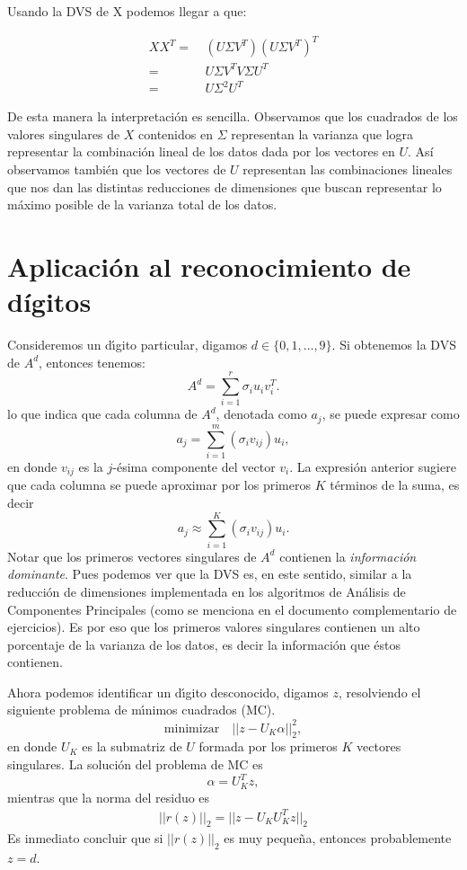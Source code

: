 \documentclass[12pt]{article}
\begin{document}
Usando la DVS de X podemos llegar a que:

\begin{align*}
XX^T = & \ (U\Sigma V^T)(U \Sigma V^T)^T\\
= & \ U \Sigma V^T V \Sigma U^T\\
= & \ U \Sigma^2 U^T
\end{align*}

De esta manera la interpretación es sencilla. Observamos que los cuadrados de los valores singulares de $X$ contenidos en $\Sigma$ representan la varianza que logra representar la combinación lineal de los datos dada por los vectores en $U$. Así observamos también que los vectores de $U$ representan las combinaciones lineales que nos dan las distintas reducciones de dimensiones que buscan representar lo máximo posible de la varianza total de los datos.


\section{Aplicación al reconocimiento de dígitos}

Consideremos un d\'{\i}gito particular, digamos $d \in \{0,1, \ldots, 9\}$. Si obtenemos la DVS de $A^d$, entonces tenemos: 
         \[
            A^d = \sum_{i=1}^r \sigma_i u_i v_i^T.
         \]
lo que indica que cada columna de $A^d$, denotada como $a_j$,  se puede expresar como
\[
      a_j = \sum_{i=1}^m (\sigma_i v_{ij}) u_i,
\]
en donde $v_{ij}$ es la $j$-\'esima componente del vector $v_i$. La expresi\'on anterior sugiere que cada columna se puede aproximar por los primeros $K$ t\'erminos de la suma, es decir
\[
       a_j \approx \sum_{i=1}^K (\sigma_i v_{ij}) u_i.
\]
Notar que los primeros vectores singulares de $A^d$ contienen la {\em informaci\'on dominante}. Pues podemos ver que la DVS es, en este sentido, similar a la reducción de dimensiones implementada en los algoritmos de Análisis de Componentes Principales (como se menciona en el documento complementario de ejercicios). Es por eso que los primeros valores singulares contienen un alto porcentaje de la varianza de los datos, es decir la información que éstos contienen.

Ahora podemos identificar un d\'{\i}gito desconocido, digamos $z$, resolviendo el siguiente problema de m\'{\i}nimos cuadrados (MC).
\[
    \mbox{minimizar}  \quad || z - U_K \alpha ||_2^2,
\]
en donde $U_K$ es la submatriz de $U$ formada por los primeros $K$ vectores singulares. La soluci\'on del problema de MC es 
\[
    \alpha = U_K^Tz,
\]
mientras que la norma del residuo es 
\begin{eqnarray}  \label{MC}
  ||r(z)||_2 = || z - U_KU_K^Tz||_2
\end{eqnarray}
 Es inmediato concluir que si $||r(z)||_2$ es muy peque\~na, entonces probablemente $z = d$.
 
\end{document}
